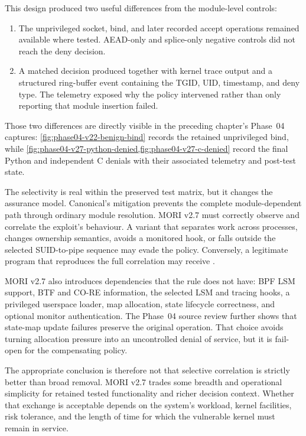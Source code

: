 This design produced two useful differences from the module-level controls:

\begin{enumerate}
    \item The unprivileged  socket, bind, and later recorded
    accept operations remained available where tested. AEAD-only and
    splice-only negative controls did not reach the deny decision.

    \item A matched decision produced  together with kernel trace
    output and a structured ring-buffer event containing the TGID, UID,
    timestamp, and deny type. The telemetry exposed why the policy intervened
    rather than only reporting that module insertion failed.
\end{enumerate}

Those two differences are directly visible in the preceding chapter's Phase~04
captures: \cref{fig:phase04-v22-benign-bind} records the retained unprivileged
bind, while \cref{fig:phase04-v27-python-denied,fig:phase04-v27-c-denied}
record the final Python and independent C denials with their associated
telemetry and post-test state.

The selectivity is real within the preserved test matrix, but it changes the
assurance model. Canonical's mitigation prevents the complete module-dependent
path through ordinary module resolution. MORI v2.7 must correctly observe and
correlate the exploit's behaviour. A variant that separates work across
processes, changes ownership semantics, avoids a monitored hook, or falls
outside the selected SUID-to-pipe sequence may evade the policy. Conversely, a
legitimate program that reproduces the full correlation may receive
.

MORI v2.7 also introduces dependencies that the  rule does not have:
BPF LSM support, BTF and CO-RE information, the selected LSM and tracing hooks,
a privileged userspace loader, map allocation, state lifecycle correctness,
and optional monitor authentication. The Phase~04 source review further shows
that state-map update failures preserve the original operation. That choice
avoids turning allocation pressure into an uncontrolled denial of service, but
it is fail-open for the compensating policy.

The appropriate conclusion is therefore not that selective correlation is
strictly better than broad removal. MORI v2.7 trades some breadth and
operational simplicity for retained tested functionality and richer decision
context. Whether that exchange is acceptable depends on the system's workload,
kernel facilities, risk tolerance, and the length of time for which the
vulnerable kernel must remain in service.

